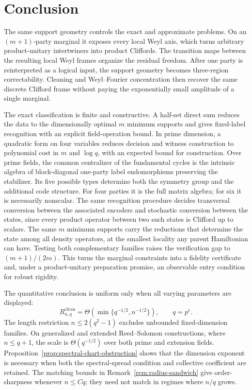 \section{Conclusion}\label{sec:conclusion}

The same support geometry controls the exact and approximate problems.
On an \((m+1)\)-party marginal it exposes every local Weyl axis, which
turns arbitrary product-unitary intertwiners into product Cliffords.  The
transition maps between the resulting local Weyl frames organize the
residual freedom.  After one party is reinterpreted as a logical input, the
support geometry becomes
three-region correctability.  Cleaning and Weyl--Fourier concentration
then recover the same discrete Clifford frame without paying the
exponentially small amplitude of a single marginal.

The exact classification is finite and constructive.  A half-set direct sum
reduces the data to the dimensionally optimal \(m\) minimum supports and gives
fixed-label recognition with an explicit field-operation bound.  In prime
dimension, a quadratic form on four variables reduces decision and witness
construction to polynomial cost in \(m\) and \(\log q\), with an expected
bound for construction.  Over
prime fields, the common centralizer of the fundamental cycles is the
intrinsic algebra of block-diagonal one-party label endomorphisms preserving
the stabilizer.  Its five possible types determine both the symmetry group
and the additional code structure.  For four parties it is the full matrix algebra; for six it is necessarily
nonscalar.  The same recognition procedure decides transversal
conversion between the associated encoders and stochastic conversion
between the states, since every product operator between two such states
is Clifford up to scalars.  The same \(m\) minimum supports carry the
reductions that determine the state among all density operators, at the
smallest locality any parent Hamiltonian can have.  Testing both complementary
families raises the verification gap to \((m+1)/(2m)\).  This turns the
marginal constraints into a fidelity certificate and, under a product-unitary
preparation promise, an observable entry condition for robust rigidity.

The quantitative conclusion is uniform only when all varying parameters
are displayed:
\[
 R^{\mathrm{clean}}_{n,q}
 =\Theta\!\left(\min\{q^{-1/2},n^{-1/2}\}\right),
 \qquad q=p^e.
\]
The length restriction \(n\leq2(q^2-1)\) excludes unbounded fixed-dimension
families.  On generalized and extended
Reed--Solomon constructions, where \(n\leq q+1\), the scale is
\(\Theta(q^{-1/2})\) over both prime and extension fields.  Proposition~\ref{prop:spectral-chart-obstruction} shows that the dimension
exponent is necessary when both the spectral-spread condition and collective
coefficient are retained.  The matching bounds in
Remark~\ref{rem:radius-sandwich} give order-sharpness whenever \(n\leq Cq\);
they need not match in regimes where \(n/q\) grows.

